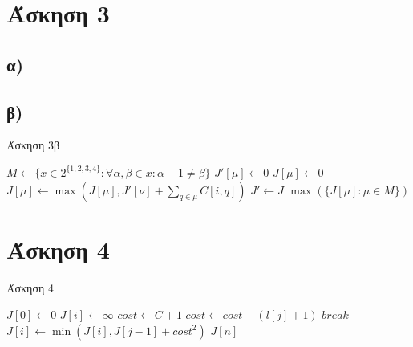 \documentclass[11pt,a4paper]{book}
\begin{document}
\section*{Άσκηση 3}
\subsection*{α)}
\subsection*{β)}
\begin{algorithm}[H]
\caption{\textgreek{Άσκηση 3β}}
\begin{algorithmic}[1]
	\State $M \gets \{ x \in 2^{\{1, 2, 3, 4\}}: \forall \alpha, \beta \in x: \alpha - 1 \neq \beta \}$
		\State $J'[ \mu ] \gets 0$
	\EndFor
			\State $J[ \mu ] \gets 0$
				\If {$\nu \cap \mu = \emptyset$}
					\State $J[ \mu ] \gets \max( J[ \mu ], J'[ \nu ] + \sum_{q \in \mu}{C[ i, q ]} )$
				\EndIf
			\EndFor
		\EndFor
		\State $J' \gets J$
	\EndFor
	\State \Return $\max( \{ J[ \mu ]: \mu \in M \} )$
\EndProcedure
\end{algorithmic}
\end{algorithm}

\section*{Άσκηση 4}

\begin{algorithm}[H]
\caption{\textgreek{Άσκηση 4}}
\begin{algorithmic}[1]
	\State $J[ 0 ] \gets 0$
		\State $J[ i ] \gets \infty$
		\State $cost \gets C + 1$
			\State $cost \gets cost - ( l[ j ] + 1 )$
				\State $break$
			\EndIf
			\State $J[ i ] \gets \min( J[ i ], J[j - 1] + cost^2 )$
		\EndFor
	\EndFor
	\State \Return $J[ n ]$
\EndProcedure
\end{algorithmic}
\end{algorithm}
\end{document}

